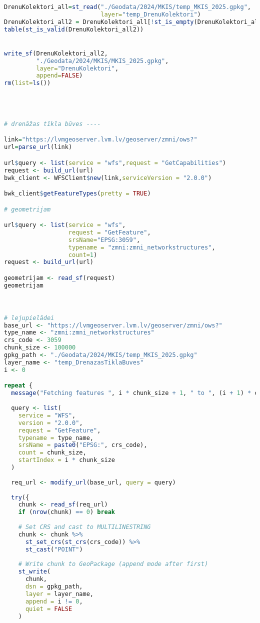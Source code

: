 \documentclass[
]{book}
\begin{document}
\begin{lstlisting}[language=R]
DrenuKolektori_all=st_read("./Geodata/2024/MKIS/temp_MKIS_2025.gpkg",
                           layer="temp_DrenuKolektori")
DrenuKolektori_all2 = DrenuKolektori_all[!st_is_empty(DrenuKolektori_all),,drop=FALSE] # 1
table(st_is_valid(DrenuKolektori_all2))


write_sf(DrenuKolektori_all2,
         "./Geodata/2024/MKIS/MKIS_2025.gpkg",
         layer="DrenuKolektori",
         append=FALSE)
rm(list=ls())




# drenāžas tīkla būves ----

link="https://lvmgeoserver.lvm.lv/geoserver/zmni/ows?"
url=parse_url(link)

url$query <- list(service = "wfs",request = "GetCapabilities")
request <- build_url(url)
bwk_client <- WFSClient$new(link,serviceVersion = "2.0.0")

bwk_client$getFeatureTypes(pretty = TRUE)

# geometrijam

url$query <- list(service = "wfs",
                  request = "GetFeature",
                  srsName="EPSG:3059",
                  typename = "zmni:zmni_networkstructures",
                  count=1)
request <- build_url(url)

geometrijam <- read_sf(request)
geometrijam



# lejupielādei
base_url <- "https://lvmgeoserver.lvm.lv/geoserver/zmni/ows?"
type_name <- "zmni:zmni_networkstructures"
crs_code <- 3059
chunk_size <- 100000
gpkg_path <- "./Geodata/2024/MKIS/temp_MKIS_2025.gpkg"
layer_name <- "temp_DrenazasTiklaBuves"
i <- 0

repeat {
  message("Fetching features ", i * chunk_size + 1, " to ", (i + 1) * chunk_size, "...")
  
  query <- list(
    service = "WFS",
    version = "2.0.0",
    request = "GetFeature",
    typename = type_name,
    srsName = paste0("EPSG:", crs_code),
    count = chunk_size,
    startIndex = i * chunk_size
  )
  
  req_url <- modify_url(base_url, query = query)
  
  try({
    chunk <- read_sf(req_url)
    if (nrow(chunk) == 0) break
    
    # Set CRS and cast to MULTILINESTRING
    chunk <- chunk %>%
      st_set_crs(st_crs(crs_code)) %>%
      st_cast("POINT")
    
    # Write chunk to GeoPackage (append mode after first)
    st_write(
      chunk, 
      dsn = gpkg_path,
      layer = layer_name,
      append = i != 0,
      quiet = FALSE
    )
    

\end{lstlisting}
\end{document}

